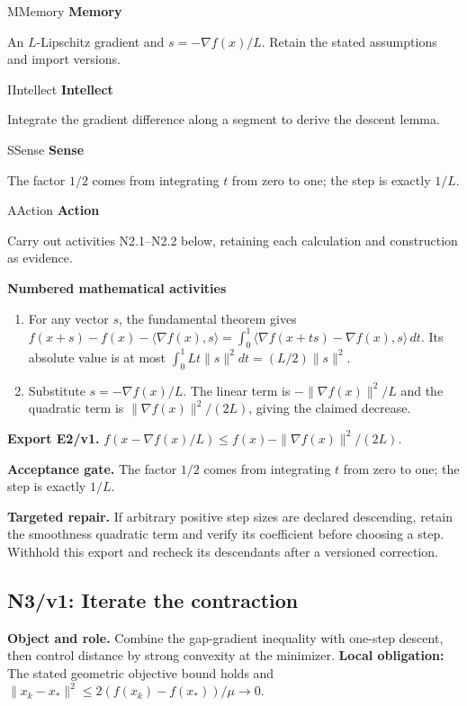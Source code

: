 \documentclass[preprint,12pt,aps,pra,showkeys,amsmath,amssymb,superscriptaddress,floatfix]{revtex4-2}
\theoremstyle{definition}
\theoremstyle{remark}
\newcommand{\mmfaculty}[3]{%
 \begin{mmfacultybox}{#1}{#2}
 {\sffamily\bfseries\color{MMBlue}#2}\par\smallskip #3
 \end{mmfacultybox}}
\newcommand{\field}[2]{\par\smallskip\noindent\textbf{#1.} #2\par}
\begin{document}
\mmfaculty{M}{Memory}{An \(L\)-Lipschitz gradient and \(s=-\nabla f(x)/L\). Retain the stated
assumptions and import versions.}

\mmfaculty{I}{Intellect}{Integrate the gradient difference along a segment to derive the descent
lemma.}

\mmfaculty{S}{Sense}{The factor \(1/2\) comes from integrating \(t\) from zero to one; the
step is exactly \(1/L\).}

\mmfaculty{A}{Action}{Carry out activities N2.1--N2.2 below, retaining each calculation and
construction as evidence.}

\smallskip\noindent\textbf{Numbered mathematical activities}

\begin{enumerate}[label=N2.\arabic*,leftmargin=3.4em]

\item For any vector \(s\), the fundamental theorem gives
\(f(x+s)-f(x)-\langle\nabla f(x),s\rangle=\int_0^1\langle\nabla f(x+ts)-\nabla f(x),s\rangle\,dt\).
Its absolute value is at most \(\int_0^1 Lt\|s\|^2dt=(L/2)\|s\|^2\).

\item Substitute \(s=-\nabla f(x)/L\). The linear term is
\(-\|\nabla f(x)\|^2/L\) and the quadratic term is
\(\|\nabla f(x)\|^2/(2L)\), giving the claimed decrease.

\end{enumerate}

\field{Export E2/v1}{\(f(x-\nabla f(x)/L)\le f(x)-\|\nabla f(x)\|^2/(2L)\).}

\field{Acceptance gate}{The factor \(1/2\) comes from integrating \(t\) from zero to one; the
step is exactly \(1/L\).}

\field{Targeted repair}{If arbitrary positive step sizes are declared descending, retain the
smoothness quadratic term and verify its coefficient before choosing a
step. Withhold this export and recheck its descendants after a versioned
correction.}

\clearpage

\subsection{N3/v1: Iterate the contraction}

\field{Object and role}{Combine the gap-gradient inequality with one-step descent, then control
distance by strong convexity at the minimizer. \textbf{Local
obligation:} The stated geometric objective bound holds and
\(\|x_k-x_*\|^2\le2(f(x_k)-f(x_*))/\mu\to0\).}
\end{document}
